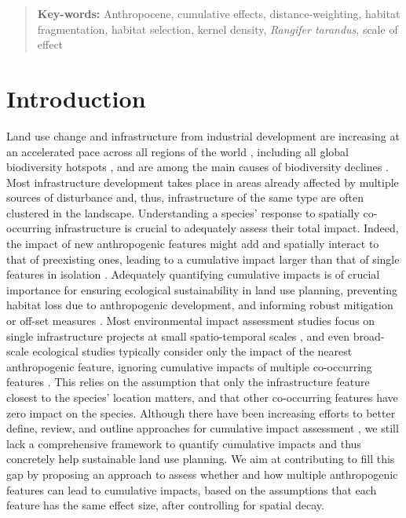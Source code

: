 \documentclass[titlepage]{article}
\begin{document}
\begin{abstract}
\textbf{Key-words:} Anthropocene, cumulative effects, distance-weighting, habitat fragmentation, habitat selection, kernel density, \textit{Rangifer tarandus}, scale of effect

\end{abstract}

\section{Introduction}

Land use change and infrastructure from industrial development are increasing at an accelerated pace across all regions of the world \citep{venter_sixteen_2016,ibisch_global_2016}, including all global biodiversity hotspots \citep{hu_overview_2021}, and are among the main causes of biodiversity declines \citep{benitez-lopez_impacts_2010,newbold_global_2015}. Most infrastructure development takes place in areas already affected by multiple sources of disturbance \citep{barber_roads_2014} and, thus, infrastructure of the same type are often clustered in the landscape. Understanding a species' response to spatially co-occurring infrastructure is crucial to adequately assess their total impact. Indeed, the impact of new anthropogenic features might add and spatially interact to that of preexisting ones, leading to a cumulative impact larger than that of 
single features in isolation \citep[Box 1; ][]{naugle_unifying_2011}.  
Adequately quantifying cumulative impacts is of crucial importance for ensuring ecological sustainability in land use planning, preventing habitat loss due to anthropogenic development, and informing robust mitigation or off-set measures \citep{gillingham_integration_2016, laurance_roads_2017}. Most environmental impact assessment studies focus on single infrastructure projects at small spatio-temporal scales \citep{johnson_regulating_2011}, and even broad-scale ecological studies typically consider only the impact of the nearest anthropogenic feature, ignoring cumulative impacts of multiple co-occurring features \citep[e.g.][]{torres_assessing_2016}. This relies on the assumption that only the infrastructure feature closest to the species' location matters, and that other co-occurring features have zero impact on the species. Although there have been increasing efforts to better define, review, and outline approaches for cumulative impact assessment \citep{naugle_unifying_2011,gillingham_integration_2016}, we still lack a comprehensive framework to quantify cumulative impacts and thus concretely help sustainable land use planning. We aim at contributing to fill this gap by proposing an approach to assess whether and how multiple anthropogenic features can lead to cumulative impacts, based on the assumptions that each feature has the same effect size, after controlling for spatial decay.
\end{document}
